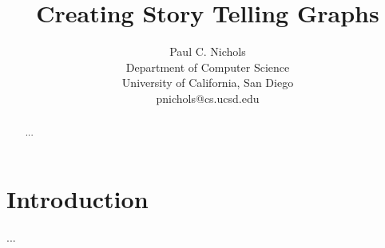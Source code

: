 \documentclass[10pt,twocolumn]{article}
\begin{document}
\begin{multicols}{2}
\title{Creating Story Telling Graphs}
\author{
    Paul C. Nichols\\
    Department of Computer Science\\
    University of California, San Diego\\
    pnichols@cs.ucsd.edu
}
\date{}
\maketitle
\end{multicols}

\begin{abstract}
...
\end{abstract}

\section{Introduction}
...
\end{document}
